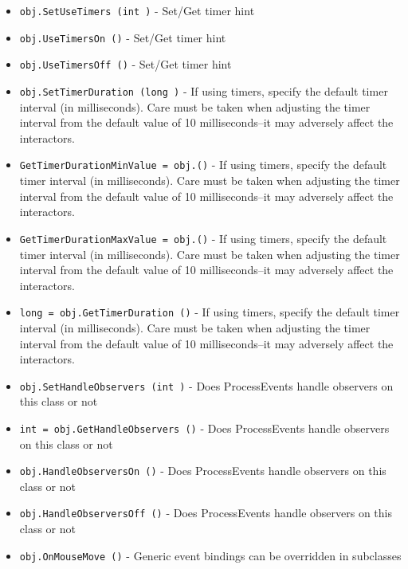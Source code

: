 \begin{itemize}
\item  \verb|obj.SetUseTimers (int )| -  Set/Get timer hint

\item  \verb|obj.UseTimersOn ()| -  Set/Get timer hint

\item  \verb|obj.UseTimersOff ()| -  Set/Get timer hint

\item  \verb|obj.SetTimerDuration (long )| -  If using timers, specify the default timer interval (in
 milliseconds). Care must be taken when adjusting the timer interval from
 the default value of 10 milliseconds--it may adversely affect the
 interactors.

\item  \verb|GetTimerDurationMinValue = obj.()| -  If using timers, specify the default timer interval (in
 milliseconds). Care must be taken when adjusting the timer interval from
 the default value of 10 milliseconds--it may adversely affect the
 interactors.

\item  \verb|GetTimerDurationMaxValue = obj.()| -  If using timers, specify the default timer interval (in
 milliseconds). Care must be taken when adjusting the timer interval from
 the default value of 10 milliseconds--it may adversely affect the
 interactors.

\item  \verb|long = obj.GetTimerDuration ()| -  If using timers, specify the default timer interval (in
 milliseconds). Care must be taken when adjusting the timer interval from
 the default value of 10 milliseconds--it may adversely affect the
 interactors.

\item  \verb|obj.SetHandleObservers (int )| -  Does ProcessEvents handle observers on this class or not

\item  \verb|int = obj.GetHandleObservers ()| -  Does ProcessEvents handle observers on this class or not

\item  \verb|obj.HandleObserversOn ()| -  Does ProcessEvents handle observers on this class or not

\item  \verb|obj.HandleObserversOff ()| -  Does ProcessEvents handle observers on this class or not

\item  \verb|obj.OnMouseMove ()| -  Generic event bindings can be overridden in subclasses


\end{itemize}
